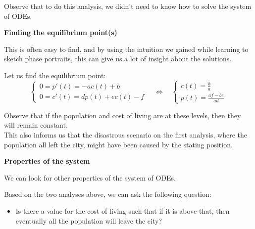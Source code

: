 Observe that to do this analysis, we didn't need to know how to solve the system of ODEs. \\






\begin{center}
\textbf{\color{cyan}
Finding the equilibrium point(s)
}
\end{center}

This is often easy to find, and by using the intuition we gained while learning to sketch phase portraits, this can give us a lot of insight about the solutions.

Let us find the equilibrium point:
$$
\begin{cases}
0= p'(t) = -a c(t) + b \\
0= c'(t) = d p(t) + e c(t) - f	
\end{cases}
\quad \Leftrightarrow \quad 
	\begin{cases}
 	\displaystyle c(t) = \frac{b}{a} \\[5pt]
	\displaystyle p(t) = \frac{af - be}{ad}
	\end{cases}
$$

Observe that if the population and cost of living are at these levels, then they will remain constant. \\

This also informs us that the disastrous scenario on the first analysis, where the population all left the city, might have been caused by the stating position. \\


\begin{center}
\textbf{\color{cyan}
Properties of the system
}
\end{center}

We can look for other properties of the system of ODEs.

Based on the two analyses above, we can ask the following question:
\begin{itemize}
	\item Is there a value for the cost of living such that if it is above that, then eventually all the population will leave the city?
\end{itemize}

